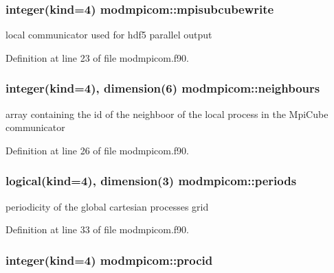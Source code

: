 \subsubsection[{\texorpdfstring{mpisubcubewrite}{mpisubcubewrite}}]{\setlength{\rightskip}{0pt plus 5cm}integer(kind=4) modmpicom\+::mpisubcubewrite}\hypertarget{namespacemodmpicom_aa950234af9f6bdf930d8c4e61a76ca96}{}\label{namespacemodmpicom_aa950234af9f6bdf930d8c4e61a76ca96}


local communicator used for hdf5 parallel output 



Definition at line 23 of file modmpicom.\+f90.

\subsubsection[{\texorpdfstring{neighbours}{neighbours}}]{\setlength{\rightskip}{0pt plus 5cm}integer(kind=4), dimension(6) modmpicom\+::neighbours}\hypertarget{namespacemodmpicom_a818e6dbfc3705e5d5bddb752f2aeb5aa}{}\label{namespacemodmpicom_a818e6dbfc3705e5d5bddb752f2aeb5aa}


array containing the id of the neighboor of the local process in the Mpi\+Cube communicator 



Definition at line 26 of file modmpicom.\+f90.

\subsubsection[{\texorpdfstring{periods}{periods}}]{\setlength{\rightskip}{0pt plus 5cm}logical(kind=4), dimension(3) modmpicom\+::periods}\hypertarget{namespacemodmpicom_a0347e6d8a15028132a57953e6ff823a2}{}\label{namespacemodmpicom_a0347e6d8a15028132a57953e6ff823a2}


periodicity of the global cartesian processes grid 



Definition at line 33 of file modmpicom.\+f90.

\subsubsection[{\texorpdfstring{procid}{procid}}]{\setlength{\rightskip}{0pt plus 5cm}integer(kind=4) modmpicom\+::procid}\hypertarget{namespacemodmpicom_a0a592a5f03c3c0d61e07b5a56fd161d1}{}\label{namespacemodmpicom_a0a592a5f03c3c0d61e07b5a56fd161d1}


